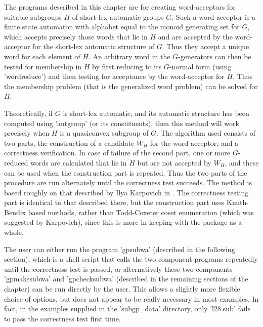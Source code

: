 The programs described in this chapter are for creating word-acceptors for
suitable subgroups $H$ of short-lex automatic groups $G$. Such a
word-acceptor is a finite state automaton with alphabet equal to the
monoid generating set for $G$, which accepts precisely those words that lie
in $H$ and are accepted by the word-acceptor for the short-lex automatic
structure of $G$. Thus they accept a unique word for each element of $H$.
An arbitrary word in the $G$-generators can then be tested for membership in $H$
by first reducing to its $G$-normal form (using 'wordreduce') and then
testing for acceptance by the word-acceptor for $H$. Thus the membership
problem (that is the generalized word problem) can be solved for $H$.

Theoretically, if $G$ is short-lex automatic, and its automatic structure
has been computed using 'autgroup' (or its constituents), then this method
will work precisely when $H$ is a quasiconvex subgroup of $G$. The algorithm
used consists of two parts, the construction of a candidate $W_H$ for the
word-acceptor, and a correctness verification. In case of failure of the
second part, one or more $G$-reduced words are calculated that lie in $H$
but are not accepted by $W_H$, and these can be used when the
construction part is repeated. Thus the two parts of the procedure are run
alternately until the correctness test succeeds. The method is based
roughly on that described by Ilya Karpovich in \cite{Kar94}. The correctness
testing part is identical to that described there, but the construction part
uses Knuth-Bendix based methods, rather than Todd-Coxeter coset enumeration
(which was suggested by Karpovich), since this is more in keeping with the
{\KBMAG} package as a whole.

The user can either run the program 'gpsubwa' (described in the following
section), which is a shell script that calls the two component programs
repeatedly until the correctness test is passed, or alternatively these
two components 'gpmakesubwa' and 'gpchecksubwa' (described in the remaining
sections of the chapter) can be run directly by the user. This allows a
slightly more flexible choice of options, but does not appear to be really
necessary in most examples. In fact, in the examples supplied in the
{\KBMAG} 'subgp\_data' directory, only 'l28.sub' fails to pass the
correctness test first time.

